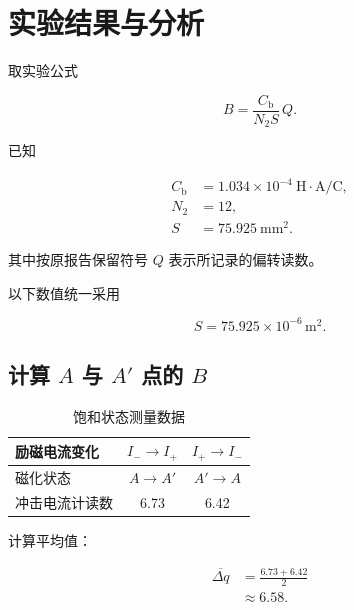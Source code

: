 \documentclass[UTF8,a4paper,12pt,fontset=none]{ctexart}
\newcommand{\Cb}{C_{\mathrm b}}
\newcommand{\Iplus}{I_{+}}
\newcommand{\Iminus}{I_{-}}
\begin{document}

\section{实验结果与分析}

取实验公式

\begin{equation}
B=\frac{\Cb}{N_2S}\,Q.
\end{equation}

已知

\begin{align*}
\Cb &=1.034\times10^{-4}\ \mathrm{H\cdot A/C},\\
N_2 &=12,\\
S &=75.925\ \mathrm{mm^2}.
\end{align*}

其中按原报告保留符号 $Q$ 表示所记录的偏转读数。

以下数值统一采用

\[
S=75.925\times10^{-6}\,\mathrm{m^2}.
\]


\subsection{计算 $A$ 与 $A'$ 点的 $B$}

\begin{table}[H]
\centering

\caption{饱和状态测量数据}

\begin{tabular}{lcc}
\toprule

励磁电流变化
& $\Iminus\to\Iplus$
& $\Iplus\to\Iminus$
\\
\midrule

磁化状态
& $A\to A'$
& $A'\to A$
\\

冲击电流计读数
& 6.73
& 6.42
\\

\bottomrule
\end{tabular}
\end{table}

计算平均值：

\begin{align*}
\overline{\Delta q}
&=\frac{6.73+6.42}{2}\\
&\approx6.58.
\end{align*}
\end{document}
